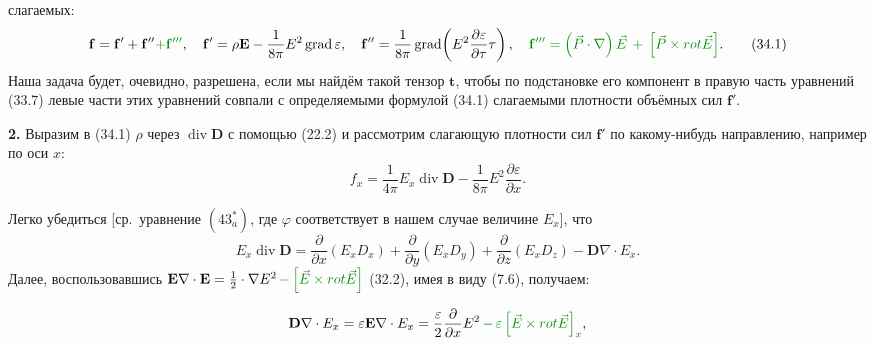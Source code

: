 \documentclass[a4paper,10pt]{article}
\newcommand{\modmath}[1]{\textcolor{modcolor}{#1}}
\begin{document}
слагаемых:
\begin{equation}
    \mathbf{f} = \mathbf{f}' + \mathbf{f}'' \modmath{+ \mathbf{f}'''},
    \quad
    \mathbf{f}' = \rho\mathbf{E} - \frac{1}{8\pi}E^2\operatorname{grad}\varepsilon,
    \quad
    \mathbf{f}'' = \frac{1}{8\pi}\operatorname{grad}\!\left(
        E^2\frac{\partial\varepsilon}{\partial\tau}\tau
    \right),
    \quad
    \modmath{\mathbf{f}''' = \left(\vec{P}\cdot\nabla\right)\vec E\,+\, \left[\vec{P} \times rot \vec{E}\right]}.
    \tag{34.1}
\end{equation}
Наша задача будет, очевидно, разрешена, если мы найдём такой тензор
$\mathbf{t}$, чтобы по подстановке его компонент в правую часть
уравнений (33.7) левые части этих уравнений совпали с определяемыми
формулой (34.1) слагаемыми плотности объёмных сил $\mathbf{f}'$.

\textbf{2.} Выразим в (34.1) $\rho$ через $\operatorname{div}\mathbf{D}$
с помощью (22.2) и рассмотрим слагающую плотности сил $\mathbf{f}'$
по какому-нибудь направлению, например по оси $x$:
$$
    f_x = \frac{1}{4\pi}E_x\operatorname{div}\mathbf{D}
        - \frac{1}{8\pi}E^2\frac{\partial\varepsilon}{\partial x}.
$$


Легко убедиться [ср.\ уравнение $(43^*_a)$, где $\varphi$ соответствует
в нашем случае величине $E_x$], что
$$
    E_x\operatorname{div}\mathbf{D}
    = \frac{\partial}{\partial x}(E_x D_x)
    + \frac{\partial}{\partial y}(E_x D_y)
    + \frac{\partial}{\partial z}(E_x D_z)
    - \mathbf{D}\nabla\cdot E_x.
$$
Далее, воспользовавшись $\mathbf{E}\nabla\cdot\mathbf{E} = \frac{1}{2}\cdot\nabla E^2 \,\modmath{- \left[\vec{E} \times rot \vec{E}\right]}$ (32.2), имея в виду (7.6), получаем:

$$
    \mathbf{D}\nabla\cdot E_x = \varepsilon\mathbf{E}\nabla\cdot E_x
    = \frac{\varepsilon}{2}\frac{\partial}{\partial x}E^2
    \,\modmath{- \,\varepsilon \left[\vec{E} \times rot \vec{E}\right]_x},
$$
\end{document}
